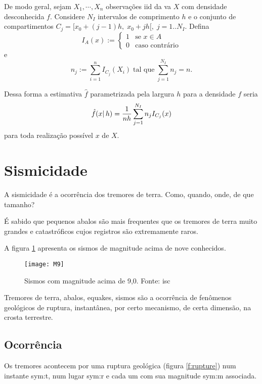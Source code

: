 De modo geral, sejam $X_1, \cdots, X_n$ observações \gls{iid} da \gls{va} $X$ com densidade desconhecida $f$.
Considere $N_I$ intervalos de comprimento $h$ e o conjunto de compartimentos $C_j = [x_0 + (j -1)h,\; x_0 + jh[,\;
j=1..N_I$.
Defina
\[
	I_A(x) := \begin{cases}
		1 & \text{se } x \in A \\
		0 & \text{caso contrário}
	\end{cases}
\]
e
\[	n_j := \sum_{i=1}^{n}I_{C_j}(X_i)\; \text{tal que} \;  \sum_{j=1}^{N_I}n_j = n. \]

Dessa forma a estimativa $\hat{f}$ parametrizada pela largura $h$ para a densidade $f$ seria
\begin{equation}
	\hat{f}(x \arrowvert\, h) = \frac{1}{nh} \sum_{j=1}^{N_I}n_jI_{C_j}(x)
	\label{eq:hist_04}
\end{equation}
para toda realização possível $x$ de $X$.






\section{Sismicidade}
\label{sec:sismicidade}

A sismicidade é a ocorrência dos tremores de terra. Como, quando, onde, de que tamanho?

É sabido que pequenos abalos são mais frequentes que os tremores de terra
muito grandes e catastróficos cujos registros são extremamente raros.

A figura \ref{f:m9} apresenta os sismos de magnitude acima de nove conhecidos.

\begin{figure}[H]
   \centering
   \texttt{[image: M9]}
   \caption[Sismos com magnitude acima de 9,0.]
   		   {Sismos com magnitude acima de 9,0. Fonte: \gls{isc}}
   \label{f:m9}
\end{figure}


Tremores de terra, abalos, \glspl{equake}, sismos são a ocorrência de
fenômenos geológicos de ruptura, instantânea, por certo mecanismo, de certa dimensão, na
crosta terrestre.

\subsection{Ocorrência}
\label{sec:ocorrencia}

Os tremores acontecem por uma ruptura geológica (figura \ref{f:rupture})
num instante \gls{sym:t}, num lugar \gls{sym:r} e cada um
com sua magnitude \gls{sym:m} associada.

